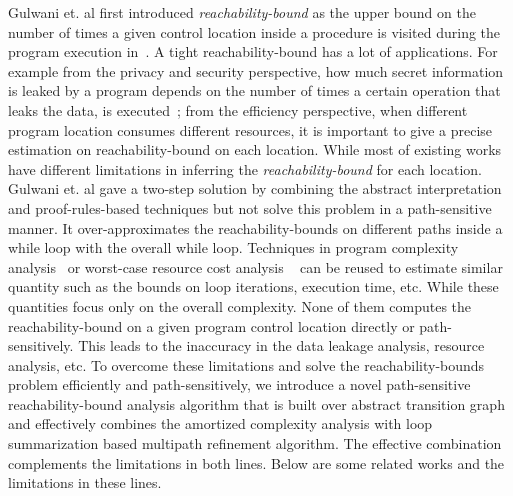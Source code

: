 Gulwani et. al first introduced \emph{reachability-bound} as the upper bound on the number of times a given control location 
inside a procedure is visited during the program execution in~\cite{GulwaniZ10}.
A tight reachability-bound has a lot of applications.
For example from the privacy and security perspective,
how much secret information is leaked by a program depends on the number of times a certain operation that leaks the data,
is executed~\cite{Malacaria07};
from the efficiency perspective, when different program location consumes different resources, it is important to give a precise estimation on reachability-bound on each location.
While most of existing works have different limitations in inferring the \emph{reachability-bound} for each location.
Gulwani et. al
gave a two-step solution by combining the abstract interpretation and proof-rules-based techniques but not solve this problem in a path-sensitive manner.
It over-approximates the reachability-bounds on different paths inside a while loop with the overall while loop.
Techniques in program complexity analysis~\cite{GustafssonEL05,HumenbergerJK18} 
or worst-case resource cost analysis
~\cite{BrockschmidtEFFG16,AlbertAGP08,AliasDFG10,Flores-MontoyaH14} can be reused to estimate similar quantity such as the
bounds on loop iterations, execution time, etc.
While these quantities focus only on  
the overall complexity.
None of them computes the reachability-bound on a given program control location directly or path-sensitively.
This leads to the inaccuracy in the data leakage analysis, resource analysis, etc.
To overcome these limitations and solve 
the reachability-bounds problem efficiently and path-sensitively, 
we introduce a novel path-sensitive reachability-bound analysis algorithm that is built over abstract transition graph and effectively combines the amortized complexity analysis with loop summarization based multipath refinement algorithm.
The effective combination complements the limitations in both lines. Below are some related works and the limitations in these lines.

